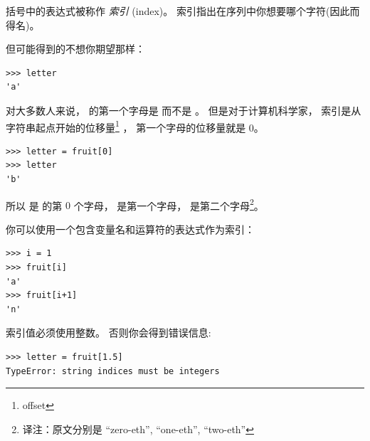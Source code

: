 括号中的表达式被称作 {\em 索引} (index)。  索引指出在序列中你想要哪个字符(因此而得名)。


但可能得到的不想你期望那样：

\begin{lstlisting}
>>> letter
'a'
\end{lstlisting}

%

对大多数人来说，  的第一个字母是  而不是 。
但是对于计算机科学家， 索引是从字符串起点开始的位移量\footnote{offset} ， 第一个字母的位移量就是 0。

\begin{lstlisting}
>>> letter = fruit[0]
>>> letter
'b'
\end{lstlisting}

%

所以  是  的第 $0$ 个字母，  是第一个字母，  是第二个字母\footnote{译注：原文分别是 ``zero-eth'', ``one-eth'', ``two-eth''}。


你可以使用一个包含变量名和运算符的表达式作为索引：

\begin{lstlisting}
>>> i = 1
>>> fruit[i]
'a'
>>> fruit[i+1]
'n'
\end{lstlisting}

%

  

索引值必须使用整数。  否则你会得到错误信息:

\begin{lstlisting}
>>> letter = fruit[1.5]
TypeError: string indices must be integers
\end{lstlisting}


%
